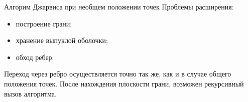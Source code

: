 \documentclass[]{beamer} %
\begin{document}
\begin{frame}{Алгорим Джарвиса при необщем положении точек}
       Проблемы расширения:
          \begin{itemize}
            \item  построение грани;
           \item  хранение выпуклой оболочки;
           \item  обход ребер.
           \end{itemize}

           Переход через ребро осуществляется точно так же, как и в случае общего положения точек. После нахождения плоскости грани, возможен рекурсивный вызов алгоритма.
\end{frame}

\end{document}
